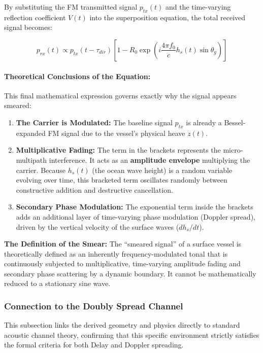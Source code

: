 \documentclass{article}
\begin{document}
By substituting the FM transmitted signal $p_{tx}(t)$ and the time-varying reflection coefficient $V(t)$ into the superposition equation, the total received signal becomes:

\[ p_{rx}(t) \propto p_{tx}(t - \tau_{dir}) \left[ 1 - R_0 \exp\left( i \frac{4\pi f_0}{c} h_s(t) \sin\theta_g \right) \right] \]

\paragraph{Theoretical Conclusions of the Equation:}

This final mathematical expression governs exactly why the signal appears smeared:

\begin{enumerate}
    \item \textbf{The Carrier is Modulated:} The baseline signal $p_{tx}$ is already a Bessel-expanded FM signal due to the vessel's physical heave $z(t)$.
    \item \textbf{Multiplicative Fading:} The term in the brackets represents the micro-multipath interference. It acts as an \textbf{amplitude envelope} multiplying the carrier. Because $h_s(t)$ (the ocean wave height) is a random variable evolving over time, this bracketed term oscillates randomly between constructive addition and destructive cancellation.
    \item \textbf{Secondary Phase Modulation:} The exponential term inside the brackets adds an additional layer of time-varying phase modulation (Doppler spread), driven by the vertical velocity of the surface waves ($dh_s/dt$).
\end{enumerate}

\textbf{The Definition of the Smear:}
The ``smeared signal'' of a surface vessel is theoretically defined as an inherently frequency-modulated tonal that is continuously subjected to multiplicative, time-varying amplitude fading and secondary phase scattering by a dynamic boundary. It cannot be mathematically reduced to a stationary sine wave.

\subsubsection{Connection to the Doubly Spread Channel}
This subsection links the derived geometry and physics directly to standard acoustic channel theory, confirming that this specific environment strictly satisfies the formal criteria for both Delay and Doppler spreading.
\end{document}
